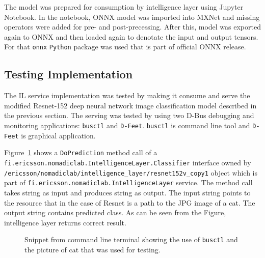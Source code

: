 \documentclass[english, 12pt, a4paper, elec, utf8, online]{aaltothesis}
\begin{document}
The model was prepared for consumption by intelligence layer using Jupyter Notebook. In the notebook, ONNX model was imported into MXNet and missing operators were added for pre- and post-precessing. After this, model was exported again to ONNX and then loaded again to denotate the input and output tensors. For that \texttt{onnx} \texttt{Python} package was used that is part of official ONNX release.   

\subsection{Testing Implementation} 
The IL service implementation was tested by making it consume and serve the modified Resnet-152 deep neural network image classification model described in the previous section. The serving was tested by using two D-Bus debugging and monitoring applications: \texttt{busctl} and \texttt{D-Feet}. \texttt{busctl} is command line tool and \texttt{D-Feet} is graphical application.

Figure~\ref{fig:busctl} shows a \texttt{DoPrediction} method call of a\\ \texttt{fi.ericsson.nomadiclab.IntelligenceLayer.Classifier} interface owned by \\ \texttt{/ericsson/nomadiclab/intelligence\_layer/resnet152v\_copy1} object which is part of \texttt{fi.ericsson.nomadiclab.IntelligenceLayer} service.  The method call takes string as input and produces string as output. The input string points to the resource that in the case of Resnet is a path to the JPG image of a cat. The output string contains predicted class. As can be seen from the Figure, intelligence layer returns correct result. 

\begin{figure}[h!]
\centering
{}
\caption{Snippet from command line terminal showing the use of \texttt{busctl} and the picture of cat that was used for testing.}\label{fig:busctl}
\end{figure}
\end{document}
